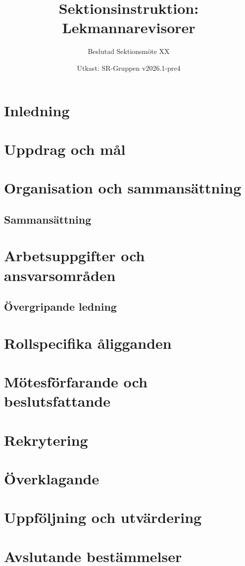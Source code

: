 \documentclass[a4paper]{dtekinstruktion}
\title{Sektionsinstruktion: Lekmannarevisorer}
\subtitle{Beslutad Sektionsmöte XX}
\date{Utkast: SR-Gruppen v2026.1-pre4}
\begin{document}
\makeheadfoot

\setcounter{tocdepth}{2}
\tableofcontents

\section{Inledning}

\section{Uppdrag och mål}

\section{Organisation och sammansättning}
\subsection{Sammansättning}

\section{Arbetsuppgifter och ansvarsområden}
\subsection{Övergripande ledning}

\section{Rollspecifika åligganden}


\section{Mötesförfarande och beslutsfattande}

\section{Rekrytering}

\section{Överklagande}
\section{Uppföljning och utvärdering}

\section{Avslutande bestämmelser}
\end{document}
